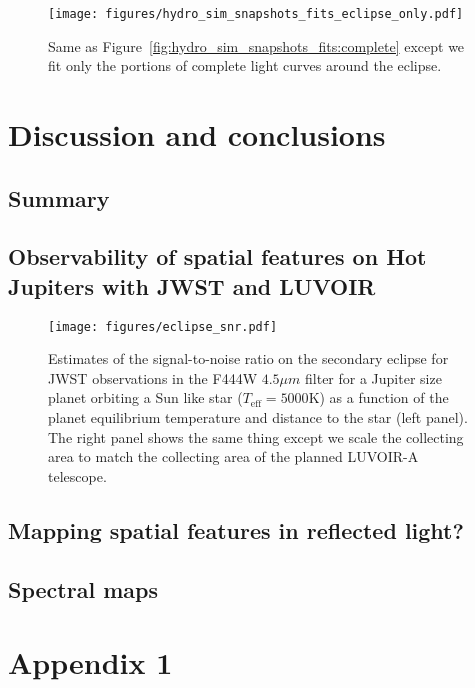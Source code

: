 \documentclass[modern]{aastex631}
\begin{document}
\begin{figure}[t!]
    \begin{centering}
    \texttt{[image: figures/hydro\_sim\_snapshots\_fits\_eclipse\_only.pdf]}
    \caption{
        Same as Figure~\ref{fig:hydro_sim_snapshots_fits:complete} except we fit only the portions of complete
        light curves around the eclipse.
    }
    \label{fig:hydro_sim_snapshots_fits:eclipse_only}
    \end{centering}
\end{figure}



\section{Discussion and conclusions}
\label{sec:discussion}

\subsection{Summary}
\label{ssec:summary}

\subsection{Observability of spatial features on Hot Jupiters with JWST and LUVOIR}
\begin{figure}[t!]
    \begin{centering}
    \texttt{[image: figures/eclipse\_snr.pdf]}
    \caption{
       Estimates of the signal-to-noise ratio on the secondary eclipse for JWST 
        observations in the F444W $4.5\mu m$ filter for a Jupiter size planet 
        orbiting a Sun like star ($T_\mathrm{eff}=5000$K) as 
       a function of the planet equilibrium temperature and distance to the star (left panel).
       The right panel shows the same thing except we scale the collecting area to match the collecting 
       area of the planned LUVOIR-A telescope.
    }
    \label{fig:eclipse_snr}
    \end{centering}
\end{figure}


\subsection{Mapping spatial features in reflected light?}

\subsection{Spectral maps}




\appendix
\section{Appendix 1}
\clearpage
\end{document}
